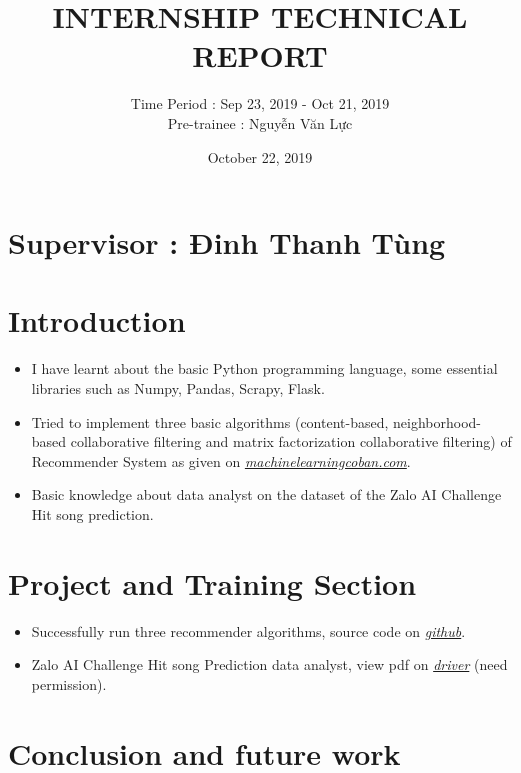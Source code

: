 \documentclass[12pt]{article}
\begin{document}
\title{\textbf{INTERNSHIP TECHNICAL REPORT}}
\author{Time Period : Sep 23, 2019 - Oct 21, 2019 \\ Pre-trainee : Nguyễn Văn Lực}
\date{October 22, 2019}
\maketitle


\section*{Supervisor : Đinh Thanh Tùng}

\section{Introduction}
\begin{itemize}
	\item I have learnt about the basic Python programming language, some essential libraries such as Numpy, Pandas, Scrapy, Flask.
	\item Tried to implement three basic algorithms (content-based, neighborhood-based collaborative filtering and matrix factorization collaborative filtering) of Recommender System as given on \href{https://machinelearningcoban.com}{\textit{machinelearningcoban.com}}.
	\item Basic knowledge about data analyst on the dataset of the Zalo AI Challenge Hit song prediction.
\end{itemize}

\section{Project and Training Section}
\begin{itemize}
	\item Successfully run three recommender algorithms, source code on \href{https://github.com/nguyenluc99/FTechAI2019/tree/master/RecommendBasic}{\textit{github}}.
	\item Zalo AI Challenge Hit song Prediction data analyst, view pdf on \href{https://drive.google.com/drive/u/0/folders/1WMBcG-PpTjC-7fDdyq_lq4Y9vH18S7XJ}{\textit{driver}} (need permission). 
\end{itemize}
\section{Conclusion and future work}
\end{document}
